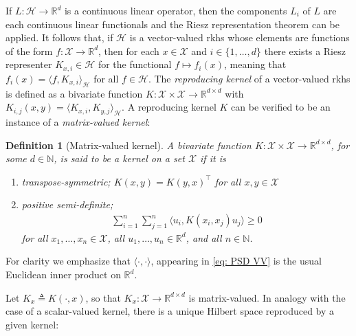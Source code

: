 \documentclass[12pt,paper=letter]{scrreprt}
\newtheorem{definition}{Definition}[chapter]
\def\defeq{\triangleq} %
\begin{document}
If $L : \mathcal{H} \rightarrow \mathbb{R}^d$ is a continuous linear operator, then the components $L_i$ of $L$ are each continuous linear functionals and the Riesz representation theorem can be applied.
It follows that, if $\mathcal{H}$ is a vector-valued \ac{rkhs} whose elements are functions of the form $f : \mathcal{X} \rightarrow \mathbb{R}^d$, then for each $x \in \mathcal{X}$ and $i \in \{1,\dots,d\}$
there exists a Riesz representer $K_{x,i} \in \mathcal{H}$ for the functional $f \mapsto f_i(x)$, meaning that $f_i(x) = \langle f , K_{x,i} \rangle_{\mathcal{H}}$ for all $f \in \mathcal{H}$.
The \emph{reproducing kernel} of a vector-valued \ac{rkhs} is defined as a bivariate function $K : \mathcal{X} \times \mathcal{X} \rightarrow \mathbb{R}^{d \times d}$ with $K_{i,j}(x,y) = \langle K_{x,i} , K_{y,j} \rangle_{\mathcal{H}}$.
A reproducing kernel $K$ can be verified to be an instance of a \emph{matrix-valued kernel}:

\begin{definition}[Matrix-valued kernel] \label{def: kernel}
A bivariate function $K : \mathcal{X} \times \mathcal{X} \rightarrow \mathbb{R}^{d \times d}$, for some $d \in \mathbb{N}$, is said to be a \emph{kernel} on a set $\mathcal{X}$ if it is
\begin{enumerate}
    \item \emph{transpose-symmetric}; $K(x,y) = K(y,x)^\top$ for all $x,y \in \mathcal{X}$
    \item \emph{positive semi-definite}; 
    \begin{align}
    \sum_{i=1}^n \sum_{j=1}^n \langle u_i , K(x_i,x_j) u_j \rangle \geq 0 \label{eq: PSD VV}
    \end{align}
    for all $x_1, \dots, x_n \in \mathcal{X}$, all $u_1,\dots,u_n \in \mathbb{R}^d$, and all $n \in \mathbb{N}$. 
\end{enumerate} 
\end{definition}

\noindent For clarity we emphasize that $\langle \cdot , \cdot \rangle$, appearing in \eqref{eq: PSD VV} is the usual Euclidean inner product on $\mathbb{R}^d$.




Let $K_x \defeq K(\cdot,x)$, so that $K_x : \mathcal{X} \rightarrow \mathbb{R}^{d \times d}$ is matrix-valued.
In analogy with the case of a scalar-valued kernel, there is a unique Hilbert space reproduced by a given kernel:
\end{document}
